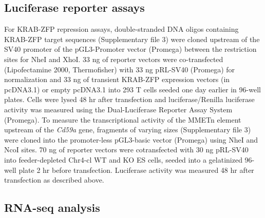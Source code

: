 \documentclass[11pt,a4paper]{article}
\begin{document}
\subsection{Luciferase reporter assays}

For KRAB-ZFP repression assays, double-stranded DNA oligos containing KRAB-ZFP target sequences (Supplementary file 3) were cloned upstream of the SV40 promoter of the pGL3-Promoter vector (Promega) between the restriction sites for NheI and XhoI. 33 ng of reporter vectors were co-transfected (Lipofectamine 2000, Thermofisher) with 33 ng pRL-SV40 (Promega) for normalization and 33 ng of transient KRAB-ZFP expression vectors (in pcDNA3.1) or empty pcDNA3.1 into 293 T cells seeded one day earlier in 96-well plates. Cells were lysed 48 hr after transfection and luciferase/Renilla luciferase activity was measured using the Dual-Luciferase Reporter Assay System (Promega). To measure the transcriptional activity of the MMETn element upstream of the \textit{Cd59a} gene, fragments of varying sizes (Supplementary file 3) were cloned into the promoter-less pGL3-basic vector (Promega) using NheI and NcoI sites. 70 ng of reporter vectors were cotransfected with 30 ng pRL-SV40 into feeder-depleted Chr4-cl WT and KO ES cells, seeded into a gelatinized 96-well plate 2 hr before transfection. Luciferase activity was measured 48 hr after transfection as described above.

\subsection{RNA-seq analysis}
\end{document}
